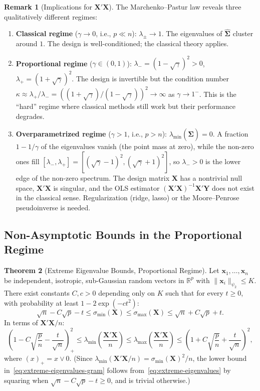 \documentclass[12pt,a4paper]{article}
\theoremstyle{definition}
\newtheorem{theorem}{Theorem}[section]
\newtheorem{remark}[theorem]{Remark}
\newcommand{\bX}{\mathbf{X}}
\newcommand{\bY}{\mathbf{Y}}
\newcommand{\bx}{\mathbf{x}}
\newcommand{\Real}{\mathbb{R}}
\newcommand{\hbSigma}{\hat{\boldsymbol{\Sigma}}}
\begin{document}
\begin{remark}[Implications for $\bX'\bX$]
The Marchenko--Pastur law reveals three qualitatively different regimes:
\begin{enumerate}[label=\textup{(\arabic*)}]
\item \textbf{Classical regime} ($\gamma \to 0$, i.e., $p \ll n$): $\lambda_\pm \to 1$. The eigenvalues of $\hbSigma$ cluster around $1$. The design is well-conditioned; the classical theory applies.
\item \textbf{Proportional regime} ($\gamma \in (0, 1)$): $\lambda_- = (1 - \sqrt\gamma)^2 > 0$, $\lambda_+ = (1 + \sqrt\gamma)^2$. The design is invertible but the condition number $\kappa \approx \lambda_+/\lambda_- = ((1+\sqrt\gamma)/(1-\sqrt\gamma))^2 \to \infty$ as $\gamma \to 1^-$. This is the ``hard'' regime where classical methods still work but their performance degrades.
\item \textbf{Overparametrized regime} ($\gamma > 1$, i.e., $p > n$): $\lambda_{\min}(\hbSigma) = 0$. A fraction $1 - 1/\gamma$ of the eigenvalues vanish (the point mass at zero), while the non-zero ones fill $[\lambda_-, \lambda_+] = [(\sqrt\gamma - 1)^2, (\sqrt\gamma + 1)^2]$, so $\lambda_- > 0$ is the lower edge of the non-zero spectrum. The design matrix $\bX$ has a nontrivial null space, $\bX'\bX$ is singular, and the OLS estimator $(\bX'\bX)^{-1}\bX'\bY$ does not exist in the classical sense. Regularization (ridge, lasso) or the Moore--Penrose pseudoinverse is needed.
\end{enumerate}
\end{remark}

\subsection{Non-Asymptotic Bounds in the Proportional Regime}

\begin{theorem}[Extreme Eigenvalue Bounds, Proportional Regime]\label{thm:extreme-eigenvalues}
Let $\bx_1, \ldots, \bx_n$ be independent, isotropic, sub-Gaussian random vectors in $\Real^p$ with $\|\bx_i\|_{\psi_2} \leqslant K$. There exist constants $C, c > 0$ depending only on $K$ such that for every $t \geqslant 0$, with probability at least $1 - 2\exp(-ct^2)$:
\begin{equation}\label{eq:extreme-eigenvalues}
\sqrt{n} - C\sqrt{p} - t \leqslant \sigma_{\min}(\bX) \leqslant \sigma_{\max}(\bX) \leqslant \sqrt{n} + C\sqrt{p} + t.
\end{equation}
In terms of $\bX'\bX/n$:
\begin{equation}\label{eq:extreme-eigenvalues-gram}
\left(1 - C\sqrt{\frac{p}{n}} - \frac{t}{\sqrt{n}}\right)_{\!+}^2 \leqslant \lambda_{\min}\!\left(\frac{\bX'\bX}{n}\right) \leqslant \lambda_{\max}\!\left(\frac{\bX'\bX}{n}\right) \leqslant \left(1 + C\sqrt{\frac{p}{n}} + \frac{t}{\sqrt{n}}\right)^2,
\end{equation}
where $(x)_+ = x \vee 0$. (Since $\lambda_{\min}(\bX'\bX/n) = \sigma_{\min}(\bX)^2/n$, the lower bound in~\eqref{eq:extreme-eigenvalues-gram} follows from~\eqref{eq:extreme-eigenvalues} by squaring when $\sqrt{n} - C\sqrt{p} - t \geqslant 0$, and is trivial otherwise.)
\end{theorem}
\end{document}
